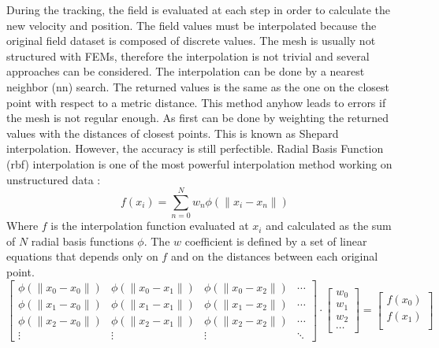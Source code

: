 \begin{refsection}
  During the tracking, the field is evaluated at each step in order to calculate the new velocity and position. The field values must be interpolated because the original field dataset is composed of discrete values. The mesh is usually not structured with FEMs, therefore the interpolation is not trivial and several approaches can be considered. The interpolation can be done by a nearest neighbor (\acrshort{nn}) search. The returned values is the same as the one on the closest point with respect to a metric distance. This method anyhow leads to errors if the mesh is not regular enough. As first can be done by weighting the returned values with the distances of closest points. This is known as Shepard interpolation. However, the accuracy is still perfectible. Radial Basis Function (\acrshort{rbf}) interpolation is one of the most powerful interpolation method working on unstructured data \cite{Wright2003}:
  \begin{equation}
    f(x_{i}) = \sum_{n=0}^{N} w_{n} \phi(\lVert x_{i} - x_{n}\rVert)
  \end{equation}
  Where $f$ is the interpolation function evaluated at $x_{i}$ and calculated as the sum of $N$ radial basis functions $\phi$. The $w$ coefficient is defined by a set of linear equations that depends only on $f$ and on the distances between each original point.
  \begin{equation}
    \begin{bmatrix}
      \phi(\lVert x_{0} - x_{0}\rVert) & \phi(\lVert x_{0} - x_{1}\rVert) & \phi(\lVert x_{0} - x_{2}\rVert) & \cdots \\
      \phi(\lVert x_{1} - x_{0}\rVert) & \phi(\lVert x_{1} - x_{1}\rVert) & \phi(\lVert x_{1} - x_{2}\rVert) & \cdots \\
      \phi(\lVert x_{2} - x_{0}\rVert) & \phi(\lVert x_{2} - x_{1}\rVert) & \phi(\lVert x_{2} - x_{2}\rVert) & \cdots \\
      \vdots                           & \vdots                           & \vdots                           & \ddots
    \end{bmatrix}
    \cdot
    \begin{bmatrix}
      w_{0} \\
      w_{1} \\
      w_{2} \\
      \cdots
    \end{bmatrix}
    =
    \begin{bmatrix}
      f(x_{0}) \\
      f(x_{1}) \\

\end{bmatrix}
\end{equation}
\end{refsection}
